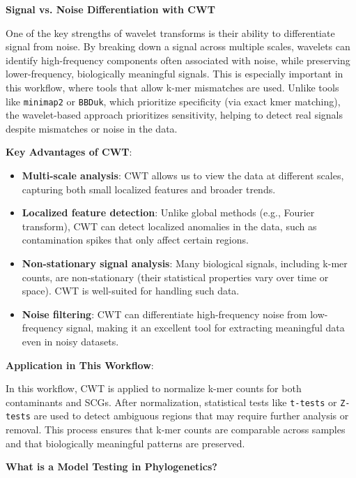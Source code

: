 \documentclass[11pt]{report}
\begin{document}
{\begin{tcolorbox}[label=box:Wavelets, colback=gray!10!white, coltitle=white, colframe=gray!80!black, title= Wavelets, breakable]
	\textbf{Signal vs. Noise Differentiation with CWT}
	
	One of the key strengths of wavelet transforms is their ability to differentiate signal from noise. By breaking down a signal across multiple scales, wavelets can identify high-frequency components often associated with noise, while preserving lower-frequency, biologically meaningful signals. This is especially important in this workflow, where tools that allow k-mer mismatches are used. Unlike tools like \texttt{minimap2} or \texttt{BBDuk}, which prioritize specificity (via exact kmer matching), the wavelet-based approach prioritizes sensitivity, helping to detect real signals despite mismatches or noise in the data.
	
	\textbf{Key Advantages of CWT}:
	\begin{itemize}
		\item \textbf{Multi-scale analysis}: CWT allows us to view the data at different scales, capturing both small localized features and broader trends.
		\item \textbf{Localized feature detection}: Unlike global methods (e.g., Fourier transform), CWT can detect localized anomalies in the data, such as contamination spikes that only affect certain regions.
		\item \textbf{Non-stationary signal analysis}: Many biological signals, including k-mer counts, are non-stationary (their statistical properties vary over time or space). CWT is well-suited for handling such data.
		\item \textbf{Noise filtering}: CWT can differentiate high-frequency noise from low-frequency signal, making it an excellent tool for extracting meaningful data even in noisy datasets.
	\end{itemize}
	
	\textbf{Application in This Workflow}:
	
	In this workflow, CWT is applied to normalize k-mer counts for both contaminants and SCGs. After normalization, statistical tests like \texttt{t-tests} or \texttt{Z-tests} are used to detect ambiguous regions that may require further analysis or removal. This process ensures that k-mer counts are comparable across samples and that biologically meaningful patterns are preserved.
	
\end{tcolorbox}


\begin{tcolorbox}[label=box:modeltesting, colback=gray!10!white, coltitle=white, colframe=gray!80!black, title=Model Testing in Phylogenetics, breakable]
	\textbf{What is a Model Testing in Phylogenetics?} 
	

\end{tcolorbox}}
\end{document}
